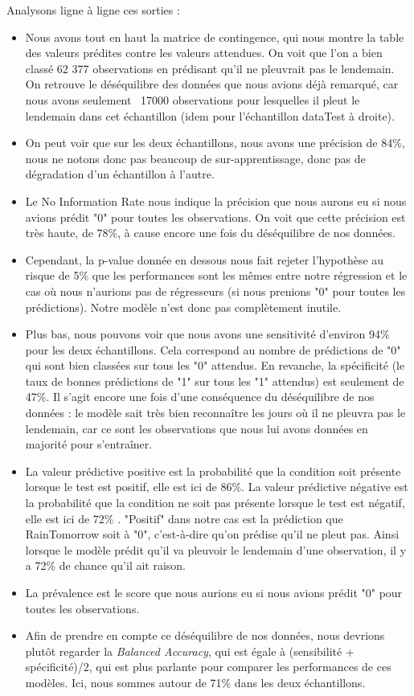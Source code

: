 \documentclass{article}
\begin{document}
Analysons ligne à ligne ces sorties : 
\begin{itemize}
    \item Nous avons tout en haut la matrice de contingence, qui nous montre la table des valeurs prédites contre les valeurs attendues. On voit que l'on a bien classé 62 377 observations en prédisant qu'il ne pleuvrait pas le lendemain. On retrouve le déséquilibre des données que nous avions déjà remarqué, car nous avons seulement ~17000 observations pour lesquelles il pleut le lendemain dans cet échantillon (idem pour l'échantillon dataTest à droite).
    \item On peut voir que sur les deux échantillons, nous avons une précision de 84\%, nous ne notons donc pas beaucoup de sur-apprentissage, donc pas de dégradation d'un échantillon à l'autre.
    \item Le No Information Rate nous indique la précision que nous aurons eu si nous avions prédit "0" pour toutes les observations. On voit que cette précision est très haute, de 78\%, à cause encore une fois du déséquilibre de nos données. 
    \item Cependant, la p-value donnée en dessous nous fait rejeter l'hypothèse au risque de 5\% que les performances sont les mêmes entre notre régression et le cas où nous n'aurions pas de régresseurs (si nous prenions "0" pour toutes les prédictions). Notre modèle n'est donc pas complètement inutile.
    \item Plus bas, nous pouvons voir que nous avons une sensitivité d'environ 94\% pour les deux échantillons. Cela correspond au nombre de prédictions de "0" qui sont bien classées sur tous les "0" attendus. En revanche, la spécificité (le taux de bonnes prédictions de "1" sur tous les "1" attendus) est seulement de 47\%. Il s'agit encore une fois d'une conséquence du déséquilibre de nos données : le modèle sait très bien reconnaître les jours où il ne pleuvra pas le lendemain, car ce sont les observations que nous lui avons données en majorité pour s'entraîner.
    \item La valeur prédictive positive est la probabilité que la condition soit présente lorsque le test est positif, elle est ici de 86\%. La valeur prédictive négative est la probabilité que la condition ne soit pas présente lorsque le test est négatif, elle est ici de 72\% \cite{frwiki:183891886}. "Positif" dans notre cas est la prédiction que RainTomorrow soit à "0", c'est-à-dire qu'on prédise qu'il ne pleut pas. Ainsi lorsque le modèle prédit qu'il va pleuvoir le lendemain d'une observation, il y a 72\% de chance qu'il ait raison.
    \item La prévalence est le score que nous aurions eu si nous avions prédit "0" pour toutes les observations.
    \item Afin de prendre en compte ce déséquilibre de nos données, nous devrions plutôt regarder la \emph{Balanced Accuracy}, qui est égale à (sensibilité + spécificité)/2, qui est plus parlante pour comparer les performances de ces modèles. Ici, nous sommes autour de 71\% dans les deux échantillons.
\end{itemize}
\end{document}
